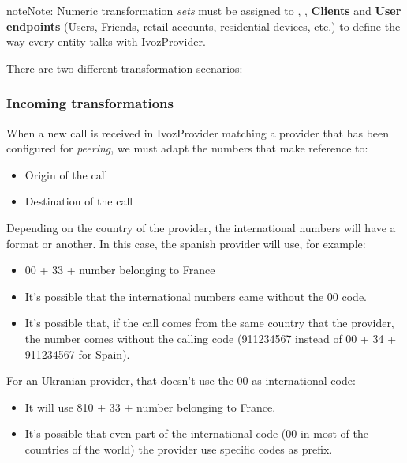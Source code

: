 \documentclass[letterpaper,10pt,english]{sphinxmanual}
\begin{document}
\begin{notice}{note}{Note:}
Numeric transformation \emph{sets} must be assigned to {\hyperref[administration_portal/brand/providers/carriers:carriers]{}}, {\hyperref[administration_portal/brand/providers/ddi_providers:ddi\string-providers]{}}, \textbf{Clients} and \textbf{User
endpoints} (Users, Friends, retail accounts, residential devices, etc.) to define the way every entity talks
with IvozProvider.
\end{notice}

There are two different transformation scenarios:


\subsubsection{Incoming transformations}
\label{administration_portal/brand/settings/numeric_transformations:incoming-transformations}
When a new call is received in IvozProvider matching a provider that has been
configured for \emph{peering}, we must adapt the numbers that make reference to:
\begin{itemize}
\item {} 
Origin of the call

\item {} 
Destination of the call

\end{itemize}

Depending on the country of the provider, the international numbers will have
a format or another. In this case, the spanish provider will use, for example:
\begin{itemize}
\item {} 
00 + 33 + number belonging to France

\item {} 
It's possible that the international numbers came without the 00 code.

\item {} 
It's possible that, if the call comes from the same country that the provider,
the number comes without the calling code (911234567 instead of 00 + 34 +
911234567 for Spain).

\end{itemize}

For an Ukranian provider, that doesn't use the 00 as international code:
\begin{itemize}
\item {} 
It will use 810 + 33 + number belonging to France.

\item {} 
It's possible that even part of the international code (00 in most of the
countries of the world) the provider use specific codes as prefix.

\end{itemize}
\end{document}
